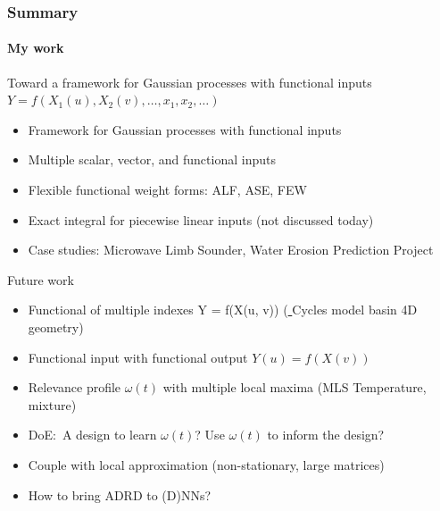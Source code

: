 \documentclass{snedecorbeamer}
\begin{document}
\begin{frame}
  \frametitle{Summary}
  \framesubtitle{My work}

  Toward a framework for Gaussian processes with functional inputs
  $Y = f(X_1(u), X_2(v), \dots, x_1, x_2, \dots)$
  \begin{itemize}
    \footnotesize
  \item Framework for Gaussian processes with functional inputs
  \item Multiple scalar, vector, and functional inputs
  \item Flexible functional weight forms: ALF, ASE, FEW
  \item Exact integral for piecewise linear inputs (not discussed today)
  \item Case studies: Microwave Limb Sounder, Water Erosion Prediction Project
  \end{itemize}
  \vspace{3ex}

  Future work
  \begin{itemize}
    \footnotesize
  \item Functional of multiple indexes Y = f(X(u, v))
    (\href{https://psumodeling.github.io/Cycles/}{
      }
    Cycles model basin 4D geometry)
  \item Functional input with functional output $Y(u) = f(X(v))$
  \item Relevance profile $\omega(t)$ with multiple local maxima (MLS Temperature, mixture)
  \item DoE:~A design to learn $\omega(t)$? Use $\omega(t)$ to inform the
    design?
  \item Couple with local approximation (non-stationary, large matrices)
  \item How to bring ADRD to (D)NNs?
  \end{itemize}
\end{frame}
\end{document}
